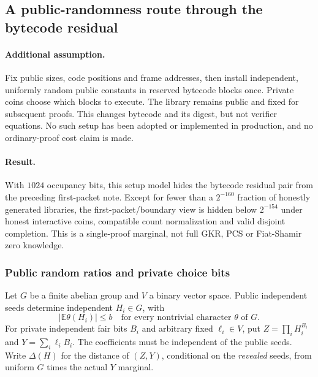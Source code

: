 \subsection{A public-randomness route through the bytecode residual}\label{note:zk-bytecode-public-library}

\paragraph{Additional assumption.} Fix public sizes, code positions and frame addresses, then install independent, uniformly random public constants in reserved bytecode blocks once. Private coins choose which blocks to execute. The library remains public and fixed for subsequent proofs. This changes bytecode and its digest, but not verifier equations. No such setup has been adopted or implemented in production, and no ordinary-proof cost claim is made.

\paragraph{Result.} With $1024$ occupancy bits, this setup model hides the bytecode residual pair from the preceding first-packet note. Except for fewer than a $2^{-160}$ fraction of honestly generated libraries, the first-packet/boundary view is hidden below $2^{-154}$ under honest interactive coins, compatible count normalization and valid disjoint completion. This is a single-proof marginal, not full GKR, PCS or Fiat-Shamir zero knowledge.

\subsubsection{Public random ratios and private choice bits}

Let $G$ be a finite abelian group and $V$ a binary vector space. Public independent seeds determine independent $H_i\in G$, with
\[
 |\mathbb E\theta(H_i)|\le b
 \quad\text{for every nontrivial character }\theta\text{ of }G.
\]
For private independent fair bits $B_i$ and arbitrary fixed $\ell_i\in V$, put $Z=\prod_iH_i^{B_i}$ and $Y=\sum_i\ell_iB_i$. The coefficients must be independent of the public seeds. Write $\Delta(H)$ for the distance of $(Z,Y)$, conditional on the \emph{revealed} seeds, from uniform $G$ times the actual $Y$ marginal.

